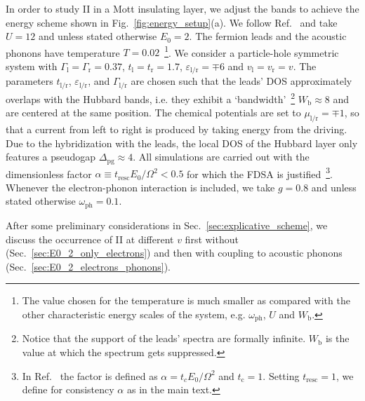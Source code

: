 \documentclass[aps,prb,groupedaddress,showpacs,twocolumn,superscriptaddress,10pt]{revtex4-2}
\newcommand{\resub}[1]{{\color{hblue} #1}}
\begin{document}
In order to study II in a Mott insulating layer, we adjust the bands to achieve the energy scheme shown in Fig.~\ref{fig:energy_setup}(a). We follow Ref.~\cite{so.do.18} and take $U=12$ and unless stated otherwise $E_0=2$. The fermion leads and the acoustic phonons have temperature $T=0.02$~\footnote{\resub{The value chosen for the temperature is much smaller as compared with the other characteristic energy scales of the system, e.g. $\omega_{\text{ph}}$, $U$ and $W_{\text{b}}$.}}. We consider a particle-hole symmetric system with $\Gamma_{\text{l}}=\Gamma_{\text{r}}=0.37$, $t_{\text{l}}=t_{\text{r}}=1.7$, $\varepsilon_{\text{l}/\text{r}}=\mp 6$ and $v_{\text{l}}=v_{\text{r}}=v$. The parameters $t_{\text{l/r}}$, $\varepsilon_{\text{l/r}}$, and  $\Gamma_{\text{l/r}}$ are chosen such that the leads' DOS approximately overlaps with the Hubbard bands, i.e. they exhibit a \textquoteleft bandwidth\textquoteright~\footnote{Notice that the support of the leads' spectra are formally infinite. $W_{\text{b}}$ is the value at which the spectrum gets  suppressed.} $W_{\text{b}}\approx 8$ and are centered at the same position. The chemical potentials are set to $\mu_{\text{l}/\text{r}} =\mp 1$, so that a current from left to right is produced by taking energy from the driving. Due to the hybridization with the leads, the local DOS of the Hubbard layer only features a pseudogap
 $\Delta_{\text{pg}} \approx 4$. All simulations are carried out with the dimensionless factor $\alpha\equiv t_{\text{resc}}E_0/\Omega^{2}<0.5$ for which the FDSA is justified~\footnote{In Ref.~\cite{so.do.18} the factor is defined as $\alpha=t_{c}E_0/\Omega^{2}$ and $t_{\text{c}}=1$. Setting $t_{\text{resc}}=1$, we define for consistency $\alpha$ as in the main text.}. Whenever the electron-phonon interaction is included, we take $g=0.8$ and unless stated otherwise $\omega_{\text{ph}}=0.1$.  

After some preliminary considerations in Sec.~\ref{sec:explicative_scheme}, we discuss the occurrence of II at different $v$ first without (Sec.~\ref{sec:E0_2_only_electrons}) and then with coupling to acoustic phonons (Sec.~\ref{sec:E0_2_electrons_phonons}). 
\end{document}
